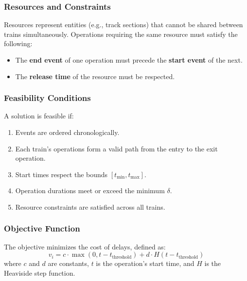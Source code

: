 \documentclass[runningheads]{llncs}
\begin{document}
\subsubsection{Resources and Constraints}
Resources represent entities (e.g., track sections) that cannot be shared between trains simultaneously. Operations requiring the same resource must satisfy the following:
\begin{itemize}
    \item The \textbf{end event} of one operation must precede the \textbf{start event} of the next.
    \item The \textbf{release time} of the resource must be respected.
\end{itemize}

\subsubsection{Feasibility Conditions}
A solution is feasible if:
\begin{enumerate}
    \item Events are ordered chronologically.
    \item Each train's operations form a valid path from the entry to the exit operation.
    \item Start times respect the bounds $[t_{\text{min}}, t_{\text{max}}]$.
    \item Operation durations meet or exceed the minimum $\delta$.
    \item Resource constraints are satisfied across all trains.
\end{enumerate}

\subsubsection{Objective Function}
The objective minimizes the cost of delays, defined as:
\[
v_i = c \cdot \max(0, t - t_{\text{threshold}}) + d \cdot H(t - t_{\text{threshold}})
\]
where $c$ and $d$ are constants, $t$ is the operation's start time, and $H$ is the Heaviside step function.
\end{document}
